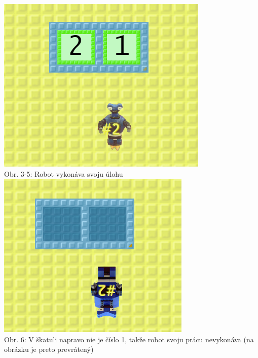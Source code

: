 \documentclass[slovak,a4paper,11pt]{article}
\begin{document}
\begin{center}
\includegraphics[scale=0.5]{toontalkrobot4}
\\ Obr. 3-5: Robot vykonáva svoju úlohu
\\
\vspace{1.5cm}
\includegraphics[scale=0.5]{toontalkrobot5}
\\ Obr. 6: V škatuli napravo nie je číslo 1, takže robot svoju prácu nevykonáva (na obrázku je preto prevrátený)
\end{center}
\end{document}
